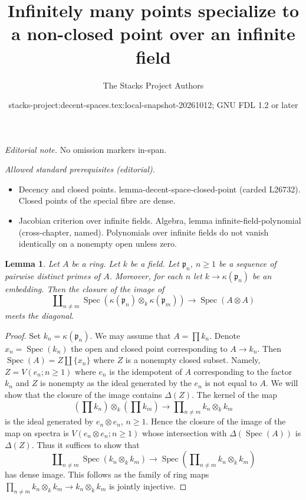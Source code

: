 \documentclass{stacks-project}
\title{Infinitely many points specialize to a non-closed point over an infinite field}
\author{The Stacks Project Authors}
\date{stacks-project:decent-spaces.tex:local-snapshot-20261012; GNU FDL 1.2 or later}
\theoremstyle{plain}
\newtheorem{lemma}[subsection]{Lemma}
\theoremstyle{definition}
\theoremstyle{remark}
\numberwithin{equation}{subsection}
\def\Spec{\mathop{\mathrm{Spec}}}
\begin{document}
\maketitle
\noindent\textit{Editorial note.} No omission markers in-span.\par\medskip
\noindent\textit{Allowed standard prerequisites (editorial).}\begin{itemize}
\item Decency and closed points. lemma-decent-space-closed-point (carded L26732). Closed points of the special fibre are dense.
\item Jacobian criterion over infinite fields. Algebra, lemma infinite-field-polynomial (cross-chapter, named). Polynomials over infinite fields do not vanish identically on a nonempty open unless zero.
\end{itemize}\medskip
\begin{lemma}
\label{lemma-infinite-number}
Let $A$ be a ring. Let $k$ be a field. Let $\mathfrak p_n$, $n \geq 1$
be a sequence of pairwise distinct primes of $A$. Moreover, for each
$n$ let $k \to \kappa(\mathfrak p_n)$ be an embedding. Then the closure
of the image of
$$
\coprod\nolimits_{n \not = m}
\Spec(\kappa(\mathfrak p_n) \otimes_k \kappa(\mathfrak p_m))
\longrightarrow
\Spec(A \otimes A)
$$
meets the diagonal.
\end{lemma}

\begin{proof}
Set $k_n = \kappa(\mathfrak p_n)$. We may assume that $A = \prod k_n$.
Denote $x_n = \Spec(k_n)$ the open and closed point corresponding to
$A \to k_n$. Then $\Spec(A) = Z \amalg \{x_n\}$ where $Z$ is a nonempty
closed subset. Namely, $Z = V(e_n; n \geq 1)$ where $e_n$
is the idempotent of $A$ corresponding to the factor $k_n$
and $Z$ is nonempty as the ideal generated by the $e_n$ is not
equal to $A$. We will show that the closure of the image
contains $\Delta(Z)$. The kernel of the map
$$
(\prod k_n) \otimes_k (\prod k_m)
\longrightarrow
\prod\nolimits_{n \not = m} k_n \otimes_k k_m
$$
is the ideal generated by $e_n \otimes e_n$, $n \geq 1$.
Hence the closure of the image of the map on spectra is 
$V(e_n \otimes e_n; n \geq 1)$ whose intersection with $\Delta(\Spec(A))$
is $\Delta(Z)$. Thus it suffices to show that
$$
\coprod\nolimits_{n \not = m} \Spec(k_n \otimes_k k_m)
\longrightarrow
\Spec(\prod\nolimits_{n \not = m} k_n \otimes_k k_m)
$$
has dense image. This follows as the family of ring maps
$\prod_{n \not = m} k_n \otimes_k k_m \to k_n \otimes_k k_m$
is jointly injective.
\end{proof}
\end{document}
